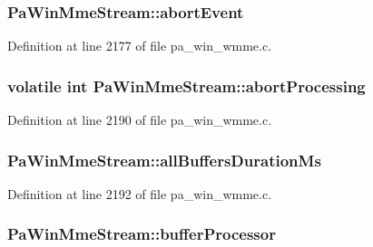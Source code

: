 \subsubsection[{\texorpdfstring{abort\+Event}{abortEvent}}]{ Pa\+Win\+Mme\+Stream\+::abort\+Event}\hypertarget{struct_pa_win_mme_stream_acc772979c75ce705491427874a42a59d}{}\label{struct_pa_win_mme_stream_acc772979c75ce705491427874a42a59d}


Definition at line 2177 of file pa\+\_\+win\+\_\+wmme.\+c.

\subsubsection[{\texorpdfstring{abort\+Processing}{abortProcessing}}]{\setlength{\rightskip}{0pt plus 5cm}volatile {\bf int} Pa\+Win\+Mme\+Stream\+::abort\+Processing}\hypertarget{struct_pa_win_mme_stream_ad25340e1c534df357baa32734cc30e36}{}\label{struct_pa_win_mme_stream_ad25340e1c534df357baa32734cc30e36}


Definition at line 2190 of file pa\+\_\+win\+\_\+wmme.\+c.

\subsubsection[{\texorpdfstring{all\+Buffers\+Duration\+Ms}{allBuffersDurationMs}}]{ Pa\+Win\+Mme\+Stream\+::all\+Buffers\+Duration\+Ms}\hypertarget{struct_pa_win_mme_stream_ab11b55925f764c163143ac2ff31a9cc4}{}\label{struct_pa_win_mme_stream_ab11b55925f764c163143ac2ff31a9cc4}


Definition at line 2192 of file pa\+\_\+win\+\_\+wmme.\+c.

\subsubsection[{\texorpdfstring{buffer\+Processor}{bufferProcessor}}]{ Pa\+Win\+Mme\+Stream\+::buffer\+Processor}\hypertarget{struct_pa_win_mme_stream_a5849490d9f32f00c3433cdaaec5a2e46}{}\label{struct_pa_win_mme_stream_a5849490d9f32f00c3433cdaaec5a2e46}


